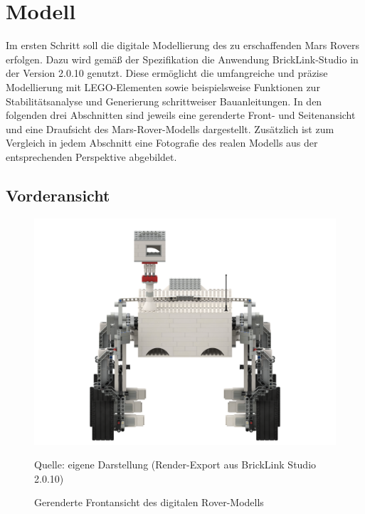 \chapter{Modell}
\label{chp:modell}

Im ersten Schritt soll die digitale Modellierung des zu erschaffenden Mars Rovers erfolgen.
Dazu wird gemäß der Spezifikation die Anwendung BrickLink-Studio in der Version 2.0.10 genutzt.
Diese ermöglicht die umfangreiche und präzise Modellierung mit LEGO-Elementen sowie beispielsweise Funktionen zur Stabilitätsanalyse und Generierung schrittweiser Bauanleitungen.
In den folgenden drei Abschnitten sind jeweils eine gerenderte Front- und Seitenansicht und eine Draufsicht des Mars-Rover-Modells dargestellt.
Zusätzlich ist zum Vergleich in jedem Abschnitt eine Fotografie des realen Modells aus der entsprechenden Perspektive abgebildet.

\section{Vorderansicht}
\label{sec:voderansicht}

\begin{figure}
	\centering
	\includegraphics[width=\textwidth]{../Images/20200429_Mars_Rover_V5_front.png}
	\vspace{0.5em}
	\parbox[c]{0.8\linewidth}{\footnotesize
		\centering
		\vspace{1em}
		Quelle: eigene Darstellung (Render-Export aus BrickLink Studio 2.0.10)
	}
	\caption{Gerenderte Frontansicht des digitalen Rover-Modells}
	\label{fig:roverfrontrender}
\end{figure}

